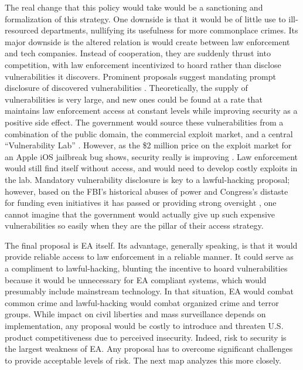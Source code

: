 The real change that this policy would take would be a sanctioning and formalization of this strategy. One downside is
that it would be of little use to ill-resourced departments, nullifying its usefulness for more commonplace crimes. Its
major downside is the altered relation is would create between law enforcement and tech companies. Instead of
cooperation, they are suddenly thrust into competition, with law enforcement incentivized to hoard rather than disclose
vulnerabilities it discovers. Prominent proposals suggest mandating prompt disclosure of discovered vulnerabilities
\cite{bellovin_lawful_2013} \cite{hennessey_lawful_2016}. Theoretically, the supply of vulnerabilities is very large,
and new ones could be found at a rate that maintains law enforcement access at constant levels while improving security
as a positive side effect. The government would source these vulnerabilities from a combination of the public domain,
the commercial exploit market, and a central ``Vulnerability Lab'' \cite{bellovin_lawful_2013}. However, as the \$2
million price on the exploit market for an Apple iOS jailbreak bug shows, security really is improving
\cite{goodin_zeroday_2019}. Law enforcement would still find itself without access, and would need to develop costly
exploits in the lab. Mandatory vulnerability disclosure is key to a \ac{lawful-hacking} proposal; however, based on the
\ac{FBI}'s historical abuses of power \cite{shamsi_2011} and Congress's distaste for funding even initiatives it has
passed \cite{keller_internet_2019} or providing strong oversight \cite{johnson_congressional_2004}, one cannot imagine
that the government would actually give up such expensive vulnerabilities so easily when they are the pillar of their
access strategy.

The final proposal is \ac{EA} itself. Its advantage, generally speaking, is that it would provide reliable access to law
enforcement in a reliable manner. It could serve as a compliment to \ac{lawful-hacking}, blunting the incentive to hoard
vulnerabilities because it would be unnecessary for \ac{EA} compliant systems, which would presumably include mainstream
technology. In that situation, \ac{EA} would combat common crime and \ac{lawful-hacking} would combat organized crime
and terror groups. While impact on civil liberties and mass surveillance depends on implementation, any proposal would
be costly to introduce and threaten U.S. product competitiveness due to perceived insecurity. Indeed, risk to security
is the largest weakness of \ac{EA}. Any proposal has to overcome significant challenges to provide acceptable levels of
risk. The next map analyzes this more closely.


